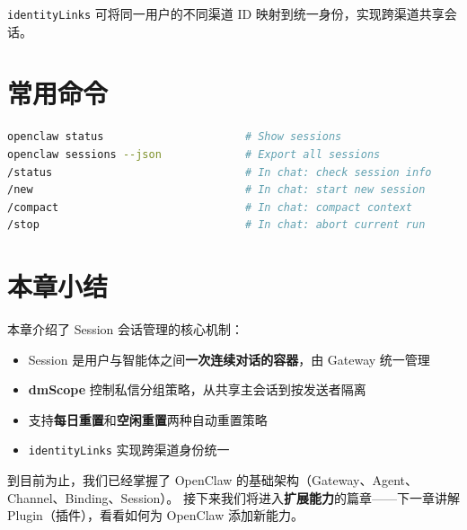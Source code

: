 \texttt{identityLinks} 可将同一用户的不同渠道 ID 映射到统一身份，实现跨渠道共享会话。

\section{常用命令}

\begin{lstlisting}[language=bash]
openclaw status                      # Show sessions
openclaw sessions --json             # Export all sessions
/status                              # In chat: check session info
/new                                 # In chat: start new session
/compact                             # In chat: compact context
/stop                                # In chat: abort current run
\end{lstlisting}

\section{本章小结}

本章介绍了 Session 会话管理的核心机制：

\begin{itemize}
  \item Session 是用户与智能体之间\textbf{一次连续对话的容器}，由 Gateway 统一管理
  \item \textbf{dmScope} 控制私信分组策略，从共享主会话到按发送者隔离
  \item 支持\textbf{每日重置}和\textbf{空闲重置}两种自动重置策略
  \item \texttt{identityLinks} 实现跨渠道身份统一
\end{itemize}

\noindent 到目前为止，我们已经掌握了 OpenClaw 的基础架构（Gateway、Agent、Channel、Binding、Session）。
接下来我们将进入\textbf{扩展能力}的篇章——下一章讲解 Plugin（插件），看看如何为 OpenClaw 添加新能力。
